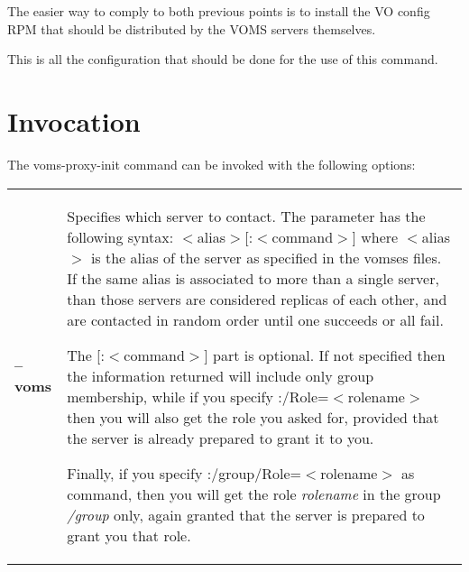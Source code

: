 \documentclass[a4paper]{book}
\begin{document}
The easier way to comply to both previous points is to install the VO
config RPM that should be distributed by the VOMS servers themselves.

This is all the configuration that should be done for the use of this
command.

\section{Invocation}

The voms-proxy-init command can be invoked with the following
options: 

\begin{longtable}{lp{3in}}
\textbf{--voms}     & Specifies which server to contact.  The parameter
                      has the following syntax:
                      $<$alias$>$[:$<$command$>$] where $<$alias$>$ is
                      the alias of the server as specified in the
                      vomses files.  If the same alias is associated
                      to more than a single server, than those servers
                      are considered replicas of each other, and are
                      contacted in random order until one succeeds or
                      all fail. 

		      The [:$<$command$>$] part is optional.  If not
		      specified then the information returned will
		      include only group membership, while if you
		      specify :/Role=$<$rolename$>$ then you will also get the
		      role you asked for, provided that the server is
		      already prepared to grant it to you.  

		      Finally, if you specify
		      :/group/Role=$<$rolename$>$ as command, then you
		      will get the role \emph{rolename} in the group
		      \emph{/group} only, again granted that the
		      server is prepared to grant you that role.


\end{longtable}
\end{document}
